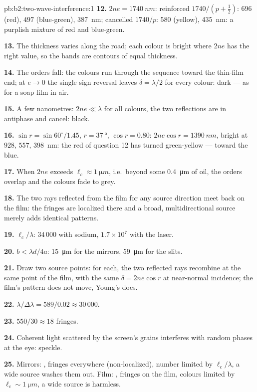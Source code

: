 \begin{solution}{pb:b2:two-wave-interference:1}
\textbf{12.} $2ne = \qty{1740}{nm}$: reinforced $1740/(p + \tfrac12)$: $696$ (red), $497$
(blue-green), \qty{387}{nm}; cancelled $1740/p$: $580$ (yellow), \qty{435}{nm}:
a purplish mixture of red and blue-green.

\textbf{13.} The thickness varies along the road; each colour is bright
where $2ne$ has the right value, so the bands are contours of equal
thickness.

\textbf{14.} The orders fall: the colours run through the sequence
toward the thin-film end; at $e \to 0$ the single sign reversal leaves
$\delta = \lambda/2$ for every colour: dark --- as for a soap film in air.

\textbf{15.} A few nanometres: $2ne \ll \lambda$ for all colours, the two
reflections are in antiphase and cancel: black.

\textbf{16.} $\sin r = \sin60^\circ/1.45$, $r = \qty{37}{\degree}$, $\cos r = 0.80$: $2ne\cos r
= \qty{1390}{nm}$, bright at $928$, $557$, \qty{398}{nm}: the red of question 12 has
turned green-yellow --- toward the blue.

\textbf{17.} When $2ne$ exceeds $\ell_c \approx \qty{1}{\micro m}$, i.e.\ beyond some
\qty{0.4}{\micro m} of oil, the orders overlap and the colours fade to grey.

\textbf{18.} The two rays reflected from the film for any source
direction meet back on the film: the fringes are localized there and
a broad, multidirectional source merely adds identical patterns.

\textbf{19.} $\ell_c/\lambda$: $34\,000$ with sodium, $1.7 \times 10^7$ with the laser.

\textbf{20.} $b < \lambda d/4a$: \qty{15}{\micro m} for the mirrors, \qty{59}{\micro m} for
the slits.

\textbf{21.} Draw two source points: for each, the two reflected rays
recombine at the same point of the film, with the same $\delta = 2ne\cos r$
at near-normal incidence; the film's pattern does not move, Young's
does.

\textbf{22.} $\lambda/\Delta\lambda = 589/0.02 \approx 30\,000$.

\textbf{23.} $550/30 \approx 18$ fringes.

\textbf{24.} Coherent light scattered by the screen's grains interferes
with random phases at the eye: speckle.

\textbf{25.} Mirrors: , fringes everywhere
(non-localized), number limited by $\ell_c/\lambda$, a wide source washes
them out. Film: , fringes on the film, colours
limited by $\ell_c \sim \qty{1}{\micro m}$, a wide source is harmless.
\end{solution}
